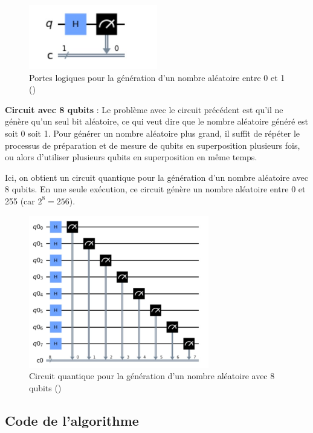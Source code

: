 \documentclass{article}
\begin{document}
\begin{figure}[H]
  \centering
  \includegraphics[width=0.5\textwidth]{img/portesLogiquesRandom.png}
  \caption{Portes logiques pour la génération d'un nombre aléatoire entre 0 et 1 (\cite{sapTrueRandomness})}
\end{figure}

\textbf{Circuit avec 8 qubits} :
Le problème avec le circuit précédent est qu'il ne génère qu'un seul bit aléatoire, ce qui veut dire que le nombre aléatoire généré est soit 0 soit 1. 
Pour générer un nombre aléatoire plus grand, il suffit de répéter le processus de préparation et de mesure de qubits en superposition plusieurs fois,
ou alors d'utiliser plusieurs qubits en superposition en même temps.

Ici, on obtient un circuit quantique pour la génération d'un nombre aléatoire avec 8 qubits.
En une seule exécution, ce circuit génère un nombre aléatoire entre 0 et 255 (car $2^8 = 256$).

\begin{figure}[H]
  \centering
  \includegraphics[width=0.7\textwidth]{img/portesLogiquesRandom8.png}
  \caption{Circuit quantique pour la génération d'un nombre aléatoire avec 8 qubits (\cite{sapTrueRandomness})}
\end{figure}

\subsection{Code de l'algorithme}
\end{document}
